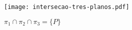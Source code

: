 \begin{figure}[h]
    \centering
    \caption{$\pi_1\cap\pi_2\cap\pi_3 = \{P\}$}
    \texttt{[image: intersecao-tres-planos.pdf]}
\end{figure}

